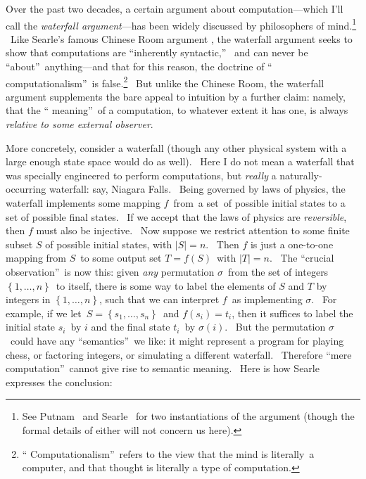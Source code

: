 \documentclass[12pt,onecolumn]{article}%
\begin{document}
Over the past two decades, a certain argument about computation---which I'll
call the \textit{waterfall argument}---has been widely discussed by
philosophers of mind.\footnote{See Putnam \cite[appendix]{putnam}\ and Searle
\cite{searle:redis}\ for two instantiations of the argument (though the formal
details of either will not concern us here).} \ Like Searle's famous Chinese
Room argument \cite{searle}, the waterfall argument seeks to show that
computations are \textquotedblleft inherently syntactic,\textquotedblright%
\ and can never be \textquotedblleft about\textquotedblright\ anything---and
that for this reason, the doctrine of \textquotedblleft
computationalism\textquotedblright\ is false.\footnote{\textquotedblleft
Computationalism\textquotedblright\ refers to the view that the mind is
literally\ a computer, and that thought is literally a type of computation.}
\ But unlike the Chinese Room, the waterfall argument supplements the bare
appeal to intuition by a further claim: namely, that the \textquotedblleft
meaning\textquotedblright\ of a computation, to whatever extent it has one, is
always \textit{relative to some external observer}.

More concretely, consider a waterfall (though any other physical system with a
large enough state space would do as well). \ Here I do not mean a waterfall
that was specially engineered to perform computations, but \textit{really} a
naturally-occurring waterfall: say, Niagara Falls. \ Being governed by laws of
physics, the waterfall implements some mapping $f$\ from\ a set\ of possible
initial states to a set of possible final states. \ If we accept that the laws
of physics are \textit{reversible}, then $f$ must also be injective. \ Now
suppose we restrict attention to some finite subset $S$ of possible initial
states, with $\left\vert S\right\vert =n$. \ Then $f$ is just a one-to-one
mapping from $S$\ to some output set $T=f\left(  S\right)  $\ with $\left\vert
T\right\vert =n$. \ The \textquotedblleft crucial
observation\textquotedblright\ is now this: given \textit{any} permutation
$\sigma$\ from the set of integers $\left\{  1,\ldots,n\right\}  $\ to itself,
there is some way to label the elements of $S$ and $T$ by integers in
$\left\{  1,\ldots,n\right\}  $, such that we can interpret $f$\ as
implementing $\sigma$. \ For example, if we let\ $S=\left\{  s_{1}%
,\ldots,s_{n}\right\}  $\ and $f\left(  s_{i}\right)  =t_{i}$, then it
suffices to label the initial state $s_{i}$\ by $i$ and the final state
$t_{i}$\ by $\sigma\left(  i\right)  $. \ But the permutation $\sigma$\ could
have any \textquotedblleft semantics\textquotedblright\ we like: it might
represent a program for playing chess, or factoring integers, or simulating a
different waterfall. \ Therefore \textquotedblleft mere
computation\textquotedblright\ cannot give rise to semantic meaning. \ Here is
how Searle \cite[p. 57]{searle:redis} expresses the conclusion:
\end{document}

